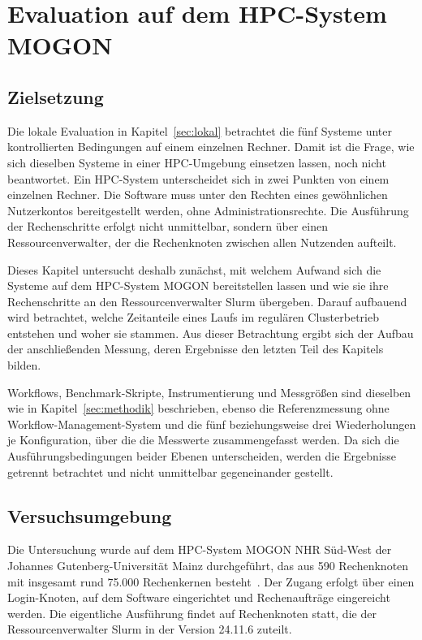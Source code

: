 
\lstset{breaklines=true, breakatwhitespace=false}

\chapter{Evaluation auf dem HPC-System MOGON}
\label{sec:mogon}
\section{Zielsetzung}
\label{sec:mogon:ziel}

Die lokale Evaluation in Kapitel~\ref{sec:lokal} betrachtet die fünf
Systeme unter kontrollierten Bedingungen auf einem einzelnen
Rechner. Damit ist die Frage, wie sich dieselben Systeme in einer
HPC-Umgebung einsetzen lassen, noch nicht beantwortet. Ein
HPC-System unterscheidet sich in zwei Punkten von einem einzelnen
Rechner. Die Software muss unter den Rechten eines gewöhnlichen
Nutzerkontos bereitgestellt werden, ohne Administrationsrechte.
Die Ausführung der Rechenschritte erfolgt nicht unmittelbar,
sondern über einen Ressourcenverwalter, der die Rechenknoten
zwischen allen Nutzenden aufteilt.

Dieses Kapitel untersucht deshalb zunächst, mit welchem Aufwand
sich die Systeme auf dem HPC-System MOGON bereitstellen lassen und
wie sie ihre Rechenschritte an den Ressourcenverwalter Slurm
übergeben. Darauf aufbauend wird betrachtet, welche Zeitanteile
eines Laufs im regulären Clusterbetrieb entstehen und woher sie
stammen. Aus dieser Betrachtung ergibt sich der Aufbau der
anschließenden Messung, deren Ergebnisse den letzten Teil des
Kapitels bilden.

Workflows, Benchmark-Skripte, Instrumentierung und Messgrößen sind
dieselben wie in Kapitel~\ref{sec:methodik} beschrieben, ebenso die
Referenzmessung ohne Workflow-Management-System und die fünf
beziehungsweise drei Wiederholungen je Konfiguration, über die die
Messwerte zusammengefasst werden. Da sich die
Ausführungsbedingungen beider Ebenen unterscheiden, werden die
Ergebnisse getrennt betrachtet und nicht unmittelbar
gegeneinander gestellt.


\section{Versuchsumgebung}
\label{sec:mogon:umgebung}

Die Untersuchung wurde auf dem HPC-System MOGON NHR Süd-West der
Johannes Gutenberg-Universität Mainz durchgeführt, das aus 590
Rechenknoten mit insgesamt rund 75.000 Rechenkernen
besteht~\cite{mogonnhr}. Der Zugang erfolgt über einen
Login-Knoten, auf dem Software eingerichtet und Rechenaufträge
eingereicht werden. Die eigentliche Ausführung findet auf
Rechenknoten statt, die der Ressourcenverwalter Slurm in der
Version 24.11.6 zuteilt.

